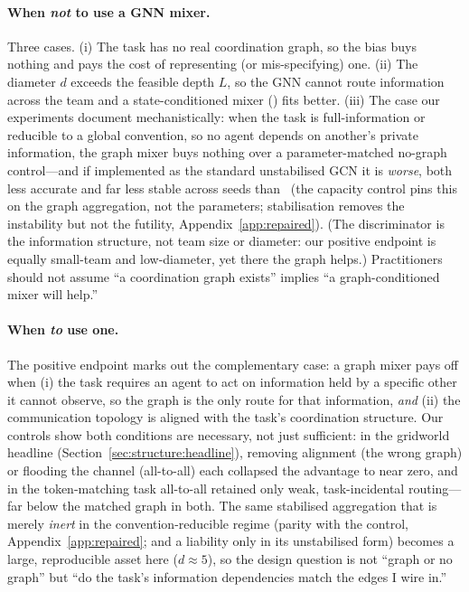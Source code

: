 \paragraph{When \emph{not} to use a GNN mixer.} Three cases. (i) The task
has no real coordination graph, so the bias buys nothing and pays the cost
of representing (or mis-specifying) one. (ii) The diameter $d$ exceeds the
feasible depth $L$, so the GNN cannot route information across the team and
a state-conditioned mixer (\qmix) fits better. (iii) The case our
experiments document mechanistically: when the task is full-information or
reducible to a global convention, so no agent depends on another's private
information, the graph mixer buys nothing over a parameter-matched no-graph
control---and if implemented as the standard unstabilised GCN it is
\emph{worse}, both less accurate and far less stable across seeds than
\qmix\ (the capacity control pins this on the graph aggregation, not the
parameters; stabilisation removes the instability but not the futility,
Appendix~\ref{app:repaired}). (The discriminator is the information
structure, not team size or diameter: our positive endpoint is equally
small-team and low-diameter, yet there the graph helps.) Practitioners should not assume ``a
coordination graph exists'' implies ``a graph-conditioned mixer will
help.''

\paragraph{When \emph{to} use one.} The positive endpoint marks out the
complementary case: a graph mixer pays off when (i) the task requires an
agent to act on information held by a specific other it cannot observe, so
the graph is the only route for that information, \emph{and} (ii) the
communication topology is aligned with the task's coordination structure. Our
controls show both conditions are necessary, not just sufficient: in the
gridworld headline (Section~\ref{sec:structure:headline}), removing alignment
(the wrong graph) or flooding the channel (all-to-all) each collapsed the
advantage to near zero, and in the token-matching task all-to-all retained only
weak, task-incidental routing---far below the matched graph in both. The same
stabilised aggregation that is merely \emph{inert} in the convention-reducible
regime (parity with the control, Appendix~\ref{app:repaired}; and a liability
only in its unstabilised form) becomes a large, reproducible
asset here ($d\approx5$), so the design question is not ``graph or no graph''
but ``do the task's information dependencies match the edges I wire in.''

